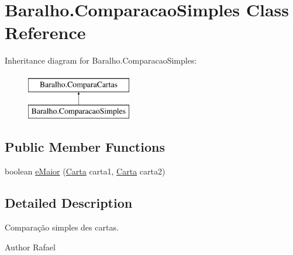 \hypertarget{class_baralho_1_1_comparacao_simples}{
\section{Baralho.ComparacaoSimples Class Reference}
\label{class_baralho_1_1_comparacao_simples}
}
Inheritance diagram for Baralho.ComparacaoSimples:\begin{figure}[H]
\begin{center}
\leavevmode
\includegraphics[height=2.000000cm]{class_baralho_1_1_comparacao_simples}
\end{center}
\end{figure}
\subsection*{Public Member Functions}
\begin{DoxyCompactItemize}
\item 
boolean \hyperlink{class_baralho_1_1_comparacao_simples_a1ea37c176e2c216536654b64ac8dc883}{eMaior} (\hyperlink{class_baralho_1_1_carta}{Carta} carta1, \hyperlink{class_baralho_1_1_carta}{Carta} carta2)
\end{DoxyCompactItemize}


\subsection{Detailed Description}
Comparação simples des cartas. \begin{DoxyAuthor}{Author}
Rafael 
\end{DoxyAuthor}


